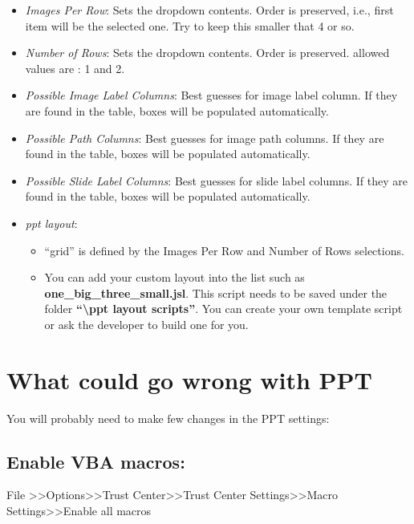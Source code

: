 \documentclass[
]{article}
\providecommand{\tightlist}{%
  \setlength{\itemsep}{0pt}\setlength{\parskip}{0pt}}
\begin{document}
\begin{itemize}
\tightlist
\item
  \emph{Images Per Row}: Sets the dropdown contents. Order is preserved, i.e., first item will be the selected one. Try to keep this smaller that 4 or so.
\item
  \emph{Number of Rows}: Sets the dropdown contents. Order is preserved. allowed values are : 1 and 2.
\item
  \emph{Possible Image Label Columns}: Best guesses for image label column. If they are found in the table, boxes will be populated automatically.
\item
  \emph{Possible Path Columns}: Best guesses for image path columns. If they are found in the table, boxes will be populated automatically.
\item
  \emph{Possible Slide Label Columns}: Best guesses for slide label columns. If they are found in the table, boxes will be populated automatically.
\item
  \emph{ppt layout}:

  \begin{itemize}
  \tightlist
  \item
    ``grid'' is defined by the Images Per Row and Number of Rows selections.
  \item
    You can add your custom layout into the list such as \textbf{one\_big\_three\_small.jsl}. This script needs to be saved under the folder \textbf{``\textbackslash ppt layout scripts''}. You can create your own template script or ask the developer to build one for you.
  \end{itemize}
\end{itemize}

\hypertarget{what-could-go-wrong-with-ppt}{%
\section{What could go wrong with PPT}\label{what-could-go-wrong-with-ppt}}

You will probably need to make few changes in the PPT settings:

\hypertarget{enable-vba-macros}{%
\subsection{Enable VBA macros:}\label{enable-vba-macros}}

File \textgreater\textgreater Options\textgreater\textgreater Trust Center\textgreater\textgreater Trust Center Settings\textgreater\textgreater Macro Settings\textgreater\textgreater Enable all macros
\end{document}
